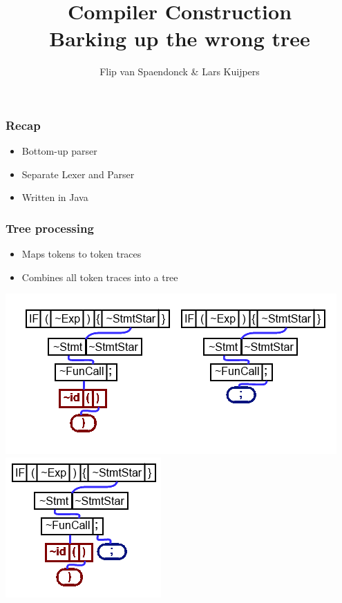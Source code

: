 \documentclass{beamer}
\author[Flip \& Lars]{Flip van Spaendonck \& Lars Kuijpers}
\title{Compiler Construction \\ Barking up the wrong tree}
\begin{document}
\begin{frame}
\titlepage
\end{frame}

\begin{frame}
\frametitle{Recap}
\begin{itemize}
\item Bottom-up parser
\item Separate Lexer and Parser
\item Written in Java
\end{itemize}
\end{frame}

\begin{frame}
\frametitle{Tree processing}
\begin{itemize}
\item Maps tokens to token traces
\item Combines all token traces into a tree
\end{itemize}
\includegraphics[scale=.5]{TokenTraces.png}\\
\pause
\includegraphics[scale=.5]{TokenTree.png}
\end{frame}
\end{document}
